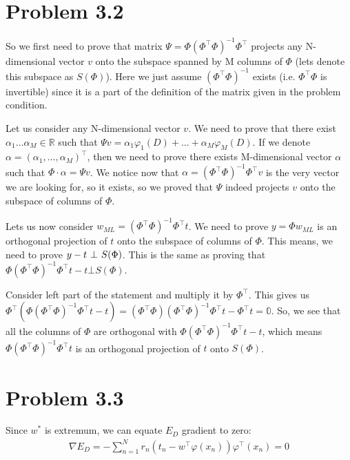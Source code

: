 \documentclass[fleqn]{article}
\begin{document}
\section*{Problem 3.2}

So we first need to prove that matrix $\Psi = \Phi(\Phi^\top\Phi)^{-1}\Phi^\top$ projects any N-dimensional vector $v$ onto the subspace spanned by M columns of $\Phi$ (lets denote this subspace as $S(\Phi)$). Here we just assume $(\Phi^\top\Phi)^{-1}$ exists (i.e. $\Phi^\top\Phi$ is invertible) since it is a part of the definition of the matrix given in the problem condition.

Let us consider any N-dimensional vector $v$. We need to prove that there exist $\alpha_1\ldots\alpha_M \in \mathbb{R}$ such that $\Psi v = \alpha_1\varphi_1(D) + \ldots + \alpha_M\varphi_M(D)$. If we denote $\alpha = (\alpha_1,\ldots,\alpha_M)^\top$, then we need to prove there exists M-dimensional vector $\alpha$ such that $\Phi\cdot\alpha = \Psi v$. We notice now that $\alpha = (\Phi^\top\Phi)^{-1}\Phi^\top v$ is the very vector we are looking for, so it exists, so we proved that $\Psi$ indeed projects $v$ onto the subspace of columns of $\Phi$. 

Lets us now consider $w_{ML} = (\Phi^\top\Phi)^{-1}\Phi^\top t$. We need to prove $y = \Phi w_{ML}$ is an orthogonal projection of $t$ onto the subspace of columns of $\Phi$. This means, we need to prove $ y - t \hspace*{0.05in} \bot \hspace*{0.05in} S(\Phi) $. This is the same as proving that $\Phi(\Phi^\top\Phi)^{-1}\Phi^\top t - t \bot S(\Phi)$.

Consider left part of the statement and multiply it by $\Phi^\top$. This gives us  $\Phi^\top (\Phi(\Phi^\top\Phi)^{-1}\Phi^\top t - t) = (\Phi^\top\Phi)(\Phi^\top\Phi)^{-1}\Phi^\top t - \Phi^\top t = \mathbb{0}$. So, we see that all the columns of $\Phi$ are orthogonal with $\Phi(\Phi^\top\Phi)^{-1}\Phi^\top t - t$, which means $\Phi(\Phi^\top\Phi)^{-1}\Phi^\top t$ is an orthogonal projection of $t$ onto $S(\Phi)$.

\section*{Problem 3.3}

Since $w^*$ is extremum, we can equate $E_D$ gradient to zero:
\begin{align}
\nabla E_D = -\sum\limits_{n=1}^Nr_n(t_n - w^\top\varphi(x_n))\varphi^\top(x_n) = 0 
\label{eq:defxyz}
\end{align}
\end{document}
